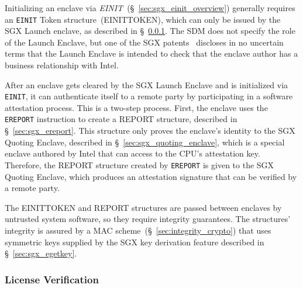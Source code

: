 Initializing an enclave via \textit{EINIT}~(\S~\ref{sec:sgx_einit_overview})
generally requires an \texttt{EINIT} Token structure~(EINITTOKEN), which can
only be issued by the SGX Launch enclave, as described in
\S~\ref{sec:sgx_launch_enclave}. The SDM does not specify the role of the
Launch Enclave, but one of the SGX patents~\cite{intel2013patent1} discloses in
no uncertain terms that the Launch Enclave is intended to check that the
enclave author has a business relationship with Intel.

After an enclave gets cleared by the SGX Launch Enclave and is initialized via
\texttt{EINIT}, it can authenticate itself to a remote party by participating
in a software attestation process. This is a two-step process. First, the
enclave uses the \texttt{EREPORT} instruction to create a REPORT structure,
described in \S~\ref{sec:sgx_ereport}. This structure only proves the enclave's
identity to the SGX Quoting Enclave, described in
\S~\ref{sec:sgx_quoting_enclave}, which is a special enclave authored by Intel
that can access to the CPU's attestation key. Therefore, the REPORT structure
created by \texttt{EREPORT} is given to the SGX Quoting Enclave, which produces
an attestation signature that can be verified by a remote party.

The EINITTOKEN and REPORT structures are passed between enclaves by untrusted
system software, so they require integrity guarantees. The structures'
integrity is assured by a MAC scheme~(\S~\ref{sec:integrity_crypto}) that uses
symmetric keys supplied by the SGX key derivation feature described in
\S~\ref{sec:sgx_egetkey}.








\subsubsection{License Verification}
\label{sec:sgx_launch_enclave}




